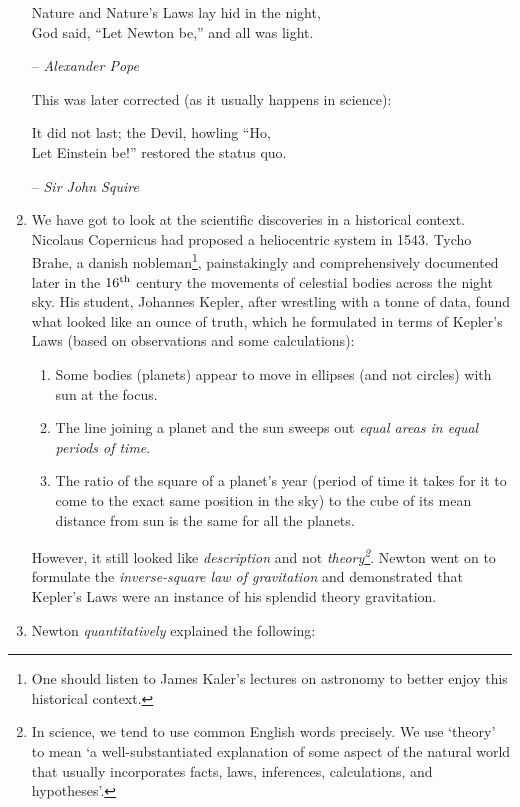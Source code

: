\documentclass[12pt,a4paper]{report}
\begin{document}
\begin{enumerate}
        \epigraph{
            Nature and Nature's Laws lay hid in the night,\\
            God said, ``Let Newton be,'' and all was light.
        }
        {
            -- \textit{Alexander Pope}
        }

    This was later corrected (as it usually happens in science): 
        \epigraph{
            It did not last; the Devil, howling ``Ho,\\
            Let Einstein be!'' restored the status quo.
        } 
        {
            -- \textit{Sir John Squire}
        }

    \item We have got to look at the scientific discoveries in a historical context. Nicolaus Copernicus had proposed \cite{copernicus} a heliocentric system in 1543. Tycho Brahe, a danish nobleman\footnote{One should listen to James Kaler's lectures on astronomy to better enjoy this historical context.}, painstakingly and comprehensively documented later in the $16\textsuperscript{th}$ century the movements of celestial bodies across the night sky. His student, Johannes Kepler, after wrestling with a tonne of data, found what looked like an ounce of truth, which he formulated in terms of Kepler's Laws (based on observations and some calculations):
        \begin{enumerate}
            \item Some bodies (planets) appear to move in ellipses (and not circles) with sun at the focus.
            \item The line joining a planet and the sun sweeps out \emph{equal areas in equal periods of time}.
            \item The ratio of the square of a planet's year (period of time it takes for it to come to the exact same position in the sky) to the cube of its mean distance from sun is the same for all the planets.
        \end{enumerate}
        However, it still looked like \emph{description} and not \emph{theory\footnote{In science, we tend to use common English words precisely. We use `theory' to mean `a well-substantiated explanation of some aspect of the natural world that usually incorporates facts, laws, inferences, calculations, and hypotheses'.}}. Newton went on to formulate the \emph{inverse-square law of gravitation} and demonstrated that Kepler's Laws were an instance of his splendid theory gravitation.
    \item Newton \emph{quantitatively} explained the following:

\end{enumerate}
\end{document}
